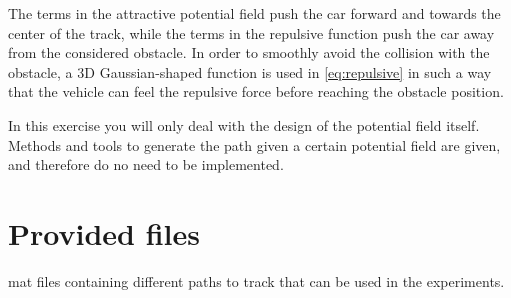 The terms in the attractive potential field push the car forward and towards the center of the track, while the terms in the repulsive function push the car away from the considered obstacle. 
In order to smoothly avoid the collision with the obstacle, a 3D Gaussian-shaped function is used in \ref{eq:repulsive} in such a way that the vehicle can feel the repulsive force before reaching the obstacle position. \par
%
In this exercise you will only deal with the design of the potential field itself. 
Methods and tools to generate the path given a certain potential field are given, and therefore do no need to be implemented. 
%
\section{Provided files}
\begin{itemize}
	\setlength\itemsep{0em}
	 mat files containing different paths to track that can be used in the experiments.		
\end{itemize}
%
